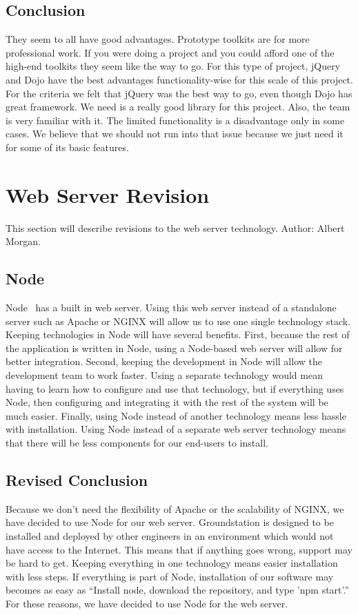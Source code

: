 \documentclass[10pt,draftclsnofoot,onecolumn]{IEEEtran}
\begin{document}
   	\subsection{Conclusion}
     	They seem to all have good advantages. 
	Prototype toolkits are for more professional work.
	If you were doing a project and you could afford one of the high-end toolkits they seem like the way to go.
	For this type of project, jQuery and Dojo have the best advantages functionality-wise for this scale of this project.  
      	For the criteria we felt that jQuery was the best way to go, even though Dojo has great framework.
	We need is a really good library for this project. Also, the team is very familiar with it.
	The limited functionality is a disadvantage only in some cases.
	We believe that we should not run into that issue because we just need it for some of its basic features.
	
	\section{Web Server Revision}
	This section will describe revisions to the web server technology. Author: Albert Morgan.

	\subsection{Node}
	Node~\cite{node} has a built in web server.
	Using this web server instead of a standalone server such as Apache or NGINX will allow us to use one single technology stack.
	Keeping technologies in Node will have several benefits.
	First, because the rest of the application is written in Node, using a Node-based web server will allow for better integration.
	Second, keeping the development in Node will allow the development team to work faster.
	Using a separate technology would mean having to learn how to configure and use that technology,
	but if everything uses Node, then configuring and integrating it with the rest of the system will be much easier.
	Finally, using Node instead of another technology means less hassle with installation.
	Using Node instead of a separate web server technology means that there will be less components for our end-users to install.

	\subsection{Revised Conclusion}
	Because we don't need the flexibility of Apache or the scalability of NGINX, we have decided to use Node for our web server.
	Groundstation is designed to be installed and deployed by other engineers in an environment which would not have access to the Internet.
	This means that if anything goes wrong, support may be hard to get.
	Keeping everything in one technology means easier installation with less steps.
	If everything is part of Node, installation of our software may becomes as easy as
	``Install node, download the repository, and type 'npm start'.''
	For these reasons, we have decided to use Node for the web server.
\end{document}
